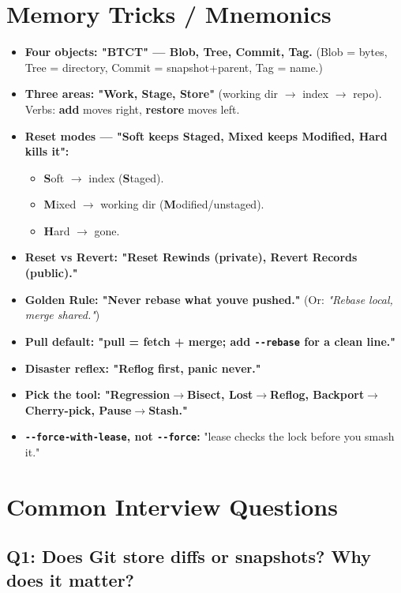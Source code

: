 \documentclass[11pt]{article}
\providecommand{\tightlist}{\setlength{\itemsep}{1pt}\setlength{\parskip}{0pt}}
\begin{document}
\section{Memory Tricks / Mnemonics}\label{memory-tricks--mnemonics}

\begin{itemize}
\tightlist
\item
  \textbf{Four objects: "BTCT" --- Blob, Tree, Commit, Tag.} (Blob = bytes, Tree = directory, Commit = snapshot+parent, Tag = name.)
\item
  \textbf{Three areas: "Work, Stage, Store"} (working dir \(\rightarrow\) index \(\rightarrow\) repo). Verbs: \textbf{add} moves right, \textbf{restore} moves left.
\item
  \textbf{Reset modes --- "Soft keeps Staged, Mixed keeps Modified, Hard kills it":}

  \begin{itemize}
  \tightlist
  \item
    \textbf{S}oft \(\rightarrow\) index (\textbf{S}taged).
  \item
    \textbf{M}ixed \(\rightarrow\) working dir (\textbf{M}odified/unstaged).
  \item
    \textbf{H}ard \(\rightarrow\) gone.
  \end{itemize}
\item
  \textbf{Reset vs Revert: "Reset Rewinds (private), Revert Records (public)."}
\item
  \textbf{Golden Rule: "Never rebase what you\textquotesingle ve pushed."} (Or: \emph{"Rebase local, merge shared."})
\item
  \textbf{Pull default: "pull = fetch + merge; add \texttt{-\/-rebase} for a clean line."}
\item
  \textbf{Disaster reflex: "Reflog first, panic never."}
\item
  \textbf{Pick the tool: "Regression\(\rightarrow\)Bisect, Lost\(\rightarrow\)Reflog, Backport\(\rightarrow\)Cherry-pick, Pause\(\rightarrow\)Stash."}
\item
  \textbf{\texttt{-\/-force-with-lease}, not \texttt{-\/-force}:} "lease checks the lock before you smash it."
\end{itemize}

\section{Common Interview Questions}\label{common-interview-questions}

\subsection{Q1: Does Git store diffs or snapshots? Why does it matter?}\label{q1-does-git-store-diffs-or-snapshots-why-does-it-matter}
\end{document}
